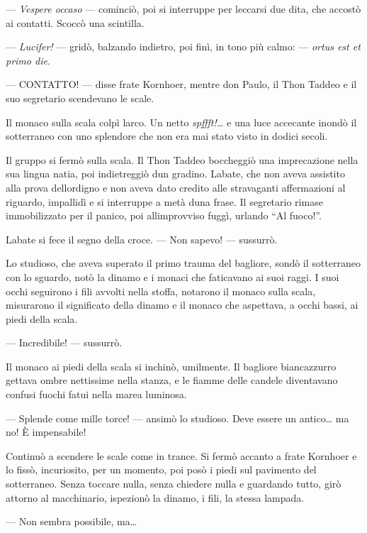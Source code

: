 --- \emph{Vespere occaso} --- cominciò, poi si interruppe per leccarsi
due dita, che accostò ai contatti. Scoccò una scintilla.

--- \emph{Lucifer!} --- gridò, balzando indietro, poi finì, in tono più
calmo: --- \emph{ortus est et primo die}.

--- CONTATTO! --- disse frate Kornhoer, mentre don Paulo, il Thon Taddeo
e il suo segretario scendevano le scale.

Il monaco sulla scala colpì l\textquotesingle arco. Un netto
\emph{spffft!\ldots{}} e una luce accecante inondò il sotterraneo con
uno splendore che non era mai stato visto in dodici secoli.

Il gruppo si fermò sulla scala. Il Thon Taddeo boccheggiò una
imprecazione nella sua lingua natia, poi indietreggiò
d\textquotesingle un gradino. L\textquotesingle abate, che non aveva
assistito alla prova dell\textquotesingle ordigno e non aveva dato
credito alle stravaganti affermazioni al riguardo, impallidì e si
interruppe a metà d\textquotesingle una frase. Il segretario rimase
immobilizzato per il panico, poi all\textquotesingle improvviso fuggì,
urlando ``Al fuoco!''.

L\textquotesingle abate si fece il segno della croce. --- Non sapevo!
--- sussurrò.

Lo studioso, che aveva superato il primo trauma del bagliore, sondò il
sotterraneo con lo sguardo, notò la dinamo e i monaci che faticavano ai
suoi raggi. I suoi occhi seguirono i fili avvolti nella stoffa, notarono
il monaco sulla scala, misurarono il significato della dinamo e il
monaco che aspettava, a occhi bassi, ai piedi della scala.

--- Incredibile! --- sussurrò.

Il monaco ai piedi della scala si inchinò, umilmente. Il bagliore
biancazzurro gettava ombre nettissime nella stanza, e le fiamme delle
candele diventavano confusi fuochi fatui nella marea luminosa.

--- Splende come mille torce! --- ansimò lo studioso. Deve essere un
antico\ldots{} ma no! È impensabile!

Continuò a scendere le scale come in trance. Si fermò accanto a frate
Kornhoer e lo fissò, incuriosito, per un momento, poi posò i piedi sul
pavimento del sotterraneo. Senza toccare nulla, senza chiedere nulla e
guardando tutto, girò attorno al macchinario, ispezionò la dinamo, i
fili, la stessa lampada.

--- Non sembra possibile, ma\ldots{}

